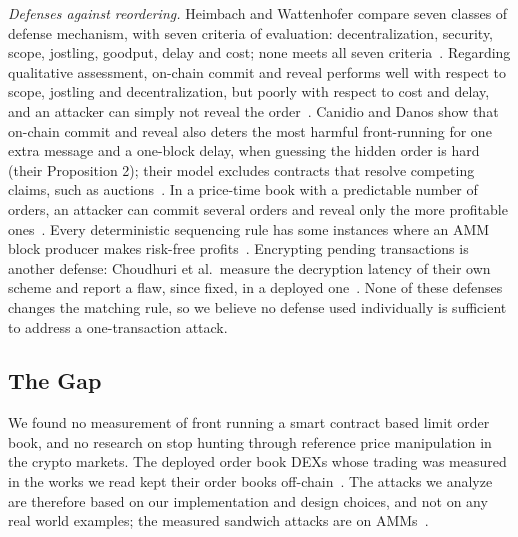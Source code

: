 \emph{Defenses against reordering.}
Heimbach and Wattenhofer compare seven classes of defense mechanism, with seven criteria of evaluation: decentralization, security, scope, jostling, goodput, delay and cost; none meets all seven criteria~\cite{src18heimbach2022}. %
Regarding qualitative assessment, on-chain commit and reveal performs well with respect to scope, jostling and decentralization, but poorly with respect to cost and delay, and an attacker can simply not reveal the order~\cite{src18heimbach2022}. %
Canidio and Danos show that on-chain commit and reveal also deters the most harmful front-running for one extra message and a one-block delay, when guessing the hidden order is hard (their Proposition 2); their model excludes contracts that resolve competing claims, such as auctions~\cite{src20canidio2024}. %
In a price-time book with a predictable number of orders, an attacker can commit several orders and reveal only the more profitable ones~\cite{src02eskandari2019}. %
Every deterministic sequencing rule has some instances where an AMM block producer makes risk-free profits~\cite{src21ferreira2023}. %
Encrypting pending transactions is another defense: Choudhuri et al.\ measure the decryption latency of their own scheme and report a flaw, since fixed, in a deployed one~\cite{src29choudhuri2024}. %
None of these defenses changes the matching rule, so we believe no defense used individually is sufficient to address a one-transaction attack. %

\subsection{The Gap}\label{sec:gap}
We found no measurement of front running a smart contract based limit order book, and no research on stop hunting through reference price manipulation in the crypto markets. %
The deployed order book DEXs whose trading was measured in the works we read kept their order books off-chain~\cite{src12victor2021}. %
The attacks we analyze are therefore based on our implementation and design choices, and not on any real world examples; the measured sandwich attacks are on AMMs~\cite{src05qin2022,src04zhou2021}. %
